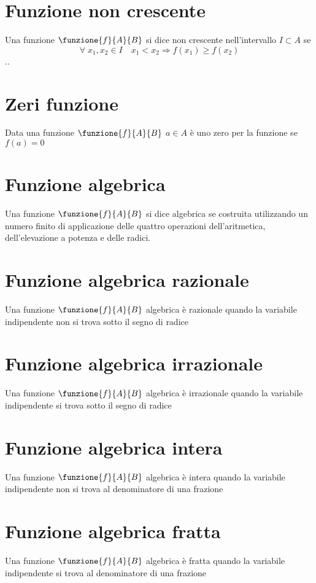 \section{Funzione non crescente}
Una funzione $\funzione{f}{A}{B}$ si dice non crescente nell'intervallo  $I\subset A$ se
\begin{equation*}
\forall\; x_1,x_2\in I\quad x_1< x_2\Longrightarrow f(x_1)\geq f(x_2)
\end{equation*}
..\section{Zeri funzione}
Data una funzione $\funzione{f}{A}{B}$ $a\in A$ è uno zero per la funzione se $f(a)=0$
\section{Funzione algebrica}
Una funzione $\funzione{f}{A}{B}$ si dice algebrica se costruita utilizzando un numero finito di applicazione delle quattro operazioni dell'aritmetica, dell'elevazione a potenza e delle radici. 
\section{Funzione algebrica razionale}
Una funzione $\funzione{f}{A}{B}$ algebrica è razionale quando la variabile indipendente non si trova sotto il segno di radice \section{Funzione algebrica irrazionale}
Una funzione $\funzione{f}{A}{B}$ algebrica è irrazionale quando la variabile indipendente  si trova sotto il segno di radice 
\section{Funzione algebrica intera}
Una funzione $\funzione{f}{A}{B}$ algebrica è intera quando la variabile indipendente non si trova al denominatore di una frazione
\section{Funzione algebrica fratta}
Una funzione $\funzione{f}{A}{B}$ algebrica è fratta quando la variabile indipendente si trova al denominatore di una frazione	
